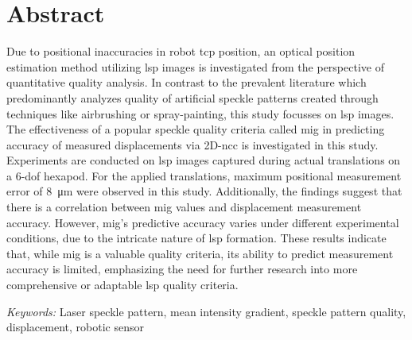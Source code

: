 \chapter*{Abstract}

Due to positional inaccuracies in robot \gls{tcp} position, an optical position estimation method utilizing \gls{lsp} images is investigated from the perspective of quantitative quality analysis. In contrast to the prevalent literature which predominantly analyzes quality of artificial speckle patterns created through techniques like airbrushing or spray-painting, this study focusses on \gls{lsp} images. The effectiveness of a popular speckle quality criteria called \gls{mig} in predicting accuracy of measured displacements via 2D-\gls{ncc} is investigated in this study. Experiments are conducted on \gls{lsp} images captured during actual translations on a 6-\gls{dof} hexapod. For the applied translations, maximum positional measurement error of \SI{8}{\micro\meter} were observed in this study. Additionally, the findings suggest that there is a correlation between \gls{mig} values and displacement measurement accuracy. However, \gls{mig}'s predictive accuracy varies under different experimental conditions, due to the intricate nature of \gls{lsp} formation. These results indicate that, while \gls{mig} is a valuable quality criteria, its ability to predict measurement accuracy is limited, emphasizing the need for further research into more comprehensive or adaptable \gls{lsp} quality criteria.   

\vspace{5mm}
\noindent \emph{Keywords:} Laser speckle pattern, mean intensity gradient, speckle pattern quality, displacement, robotic sensor

